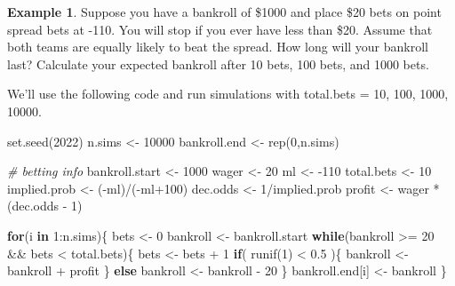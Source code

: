 \documentclass[
  11pt,
]{book}
\newenvironment{Shaded}{\begin{snugshade}}{\end{snugshade}}
\newcommand{\CommentTok}[1]{\textcolor[rgb]{0.56,0.35,0.01}{\textit{#1}}}
\newcommand{\ControlFlowTok}[1]{\textcolor[rgb]{0.13,0.29,0.53}{\textbf{#1}}}
\newcommand{\DecValTok}[1]{\textcolor[rgb]{0.00,0.00,0.81}{#1}}
\newcommand{\FloatTok}[1]{\textcolor[rgb]{0.00,0.00,0.81}{#1}}
\newcommand{\FunctionTok}[1]{\textcolor[rgb]{0.00,0.00,0.00}{#1}}
\newcommand{\NormalTok}[1]{#1}
\newcommand{\OtherTok}[1]{\textcolor[rgb]{0.56,0.35,0.01}{#1}}
\newcommand{\SpecialCharTok}[1]{\textcolor[rgb]{0.00,0.00,0.00}{#1}}
\theoremstyle{definition}
\theoremstyle{definition}
\newtheorem{example}{Example}[chapter]
\theoremstyle{definition}
\theoremstyle{definition}
\theoremstyle{remark}
\begin{document}
\begin{example}
Suppose you have a bankroll of \$1000 and place \$20 bets on point spread bets at -110. You will stop if you ever have less than \$20. Assume that both teams are equally likely to beat the spread. How long will your bankroll last? Calculate your expected bankroll after 10 bets, 100 bets, and 1000 bets.
\end{example}

We'll use the following code and run simulations with total.bets = 10, 100, 1000, 10000.

\begin{Shaded}
\begin{Highlighting}[]
\FunctionTok{set.seed}\NormalTok{(}\DecValTok{2022}\NormalTok{)}
\NormalTok{n.sims }\OtherTok{\textless{}{-}} \DecValTok{10000}
\NormalTok{bankroll.end }\OtherTok{\textless{}{-}} \FunctionTok{rep}\NormalTok{(}\DecValTok{0}\NormalTok{,n.sims)}

\CommentTok{\# betting info}
\NormalTok{bankroll.start }\OtherTok{\textless{}{-}} \DecValTok{1000}
\NormalTok{wager }\OtherTok{\textless{}{-}} \DecValTok{20}
\NormalTok{ml }\OtherTok{\textless{}{-}} \SpecialCharTok{{-}}\DecValTok{110}
\NormalTok{total.bets }\OtherTok{\textless{}{-}} \DecValTok{10}
\NormalTok{implied.prob }\OtherTok{\textless{}{-}}\NormalTok{ (}\SpecialCharTok{{-}}\NormalTok{ml)}\SpecialCharTok{/}\NormalTok{(}\SpecialCharTok{{-}}\NormalTok{ml}\SpecialCharTok{+}\DecValTok{100}\NormalTok{)}
\NormalTok{dec.odds }\OtherTok{\textless{}{-}} \DecValTok{1}\SpecialCharTok{/}\NormalTok{implied.prob}
\NormalTok{profit }\OtherTok{\textless{}{-}}\NormalTok{ wager }\SpecialCharTok{*}\NormalTok{ (dec.odds }\SpecialCharTok{{-}} \DecValTok{1}\NormalTok{)}

\ControlFlowTok{for}\NormalTok{(i }\ControlFlowTok{in} \DecValTok{1}\SpecialCharTok{:}\NormalTok{n.sims)\{}
\NormalTok{  bets }\OtherTok{\textless{}{-}} \DecValTok{0}
\NormalTok{  bankroll }\OtherTok{\textless{}{-}}\NormalTok{ bankroll.start}
  \ControlFlowTok{while}\NormalTok{(bankroll }\SpecialCharTok{\textgreater{}=} \DecValTok{20} \SpecialCharTok{\&\&}\NormalTok{ bets }\SpecialCharTok{\textless{}}\NormalTok{ total.bets)\{}
\NormalTok{    bets }\OtherTok{\textless{}{-}}\NormalTok{ bets }\SpecialCharTok{+} \DecValTok{1}
    \ControlFlowTok{if}\NormalTok{( }\FunctionTok{runif}\NormalTok{(}\DecValTok{1}\NormalTok{) }\SpecialCharTok{\textless{}} \FloatTok{0.5}\NormalTok{ )\{}
\NormalTok{      bankroll }\OtherTok{\textless{}{-}}\NormalTok{ bankroll }\SpecialCharTok{+}\NormalTok{ profit}
\NormalTok{    \} }\ControlFlowTok{else}
\NormalTok{      bankroll }\OtherTok{\textless{}{-}}\NormalTok{ bankroll }\SpecialCharTok{{-}} \DecValTok{20}
\NormalTok{  \}}
\NormalTok{  bankroll.end[i] }\OtherTok{\textless{}{-}}\NormalTok{ bankroll}
\NormalTok{\}}


\end{Highlighting}
\end{Shaded}
\end{document}

